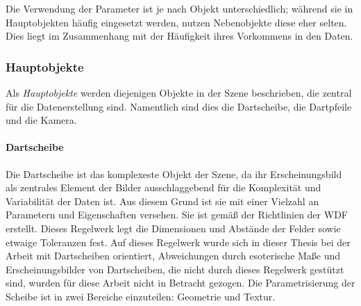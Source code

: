 \begin{center}
    \label{fig:age}
\end{center}

Die Verwendung der Parameter ist je nach Objekt unterschiedlich; während sie in Hauptobjekten häufig eingesetzt werden, nutzen Nebenobjekte diese eher selten. Dies liegt im Zusammenhang mit der Häufigkeit ihres Vorkommens in den Daten.


\subsubsection{Hauptobjekte}
\label{sec:impl:daten:blender:hauptobjekte}

Als \textit{Hauptobjekte} werden diejenigen Objekte in der Szene beschrieben, die zentral für die Datenerstellung sind. Namentlich sind dies die Dartscheibe, die Dartpfeile und die Kamera.

\paragraph{Dartscheibe}
\label{sec:impl:daten:blender:hauptobjekte:dartscheibe}

Die Dartscheibe ist das komplexeste Objekt der Szene, da ihr Erscheinungsbild als zentrales Element der Bilder ausschlaggebend für die Komplexität und Variabilität der Daten ist. Aus diesem Grund ist sie mit einer Vielzahl an Parametern und Eigenschaften versehen. Sie ist gemäß der Richtlinien  der \ac{WDF} \cite{wdf-rules} erstellt. Dieses Regelwerk legt die Dimensionen und Abstände der Felder sowie etwaige Toleranzen fest. Auf dieses Regelwerk wurde sich in dieser Thesis bei der Arbeit mit Dartscheiben orientiert, Abweichungen durch esoterische Maße und Erscheinungsbilder von Dartscheiben, die nicht durch dieses Regelwerk gestützt sind, wurden für diese Arbeit nicht in Betracht gezogen. Die Parametrisierung der Scheibe ist in zwei Bereiche einzuteilen: Geometrie und Textur.

